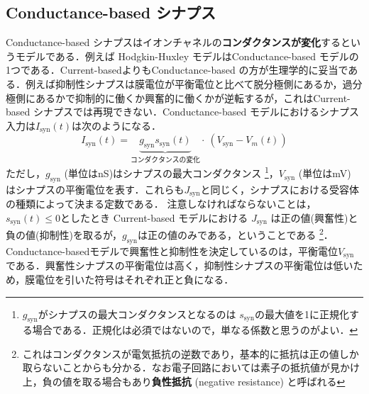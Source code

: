 \subsection{Conductance-based シナプス
}
Conductance-based シナプスはイオンチャネルの\textbf{コンダクタンスが変化}するというモデルである．例えば Hodgkin-Huxley モデルはConductance-based モデルの1つである．Current-basedよりもConductance-based の方が生理学的に妥当である．例えば抑制性シナプスは膜電位が平衡電位と比べて脱分極側にあるか，過分極側にあるかで抑制的に働くか興奮的に働くかが逆転するが，これはCurrent-based シナプスでは再現できない．Conductance-based モデルにおけるシナプス入力は$I_{\text{syn}}(t)$は次のようになる． 
\begin{equation}
I_{\text{syn}}(t)=\underbrace{g_{\text{syn}}s_{\text{syn}}(t)}_{コンダクタンスの変化}\cdot\ \left(V_{\text{syn}}-V_{m}(t)\right)    
\end{equation}
ただし，$g_{\text{syn}}$ (単位はnS)はシナプスの最大コンダクタンス \footnote{$g_{\text{syn}}$がシナプスの最大コンダクタンスとなるのは $s_{\text{syn}}$の最大値を1に正規化する場合である．正規化は必須ではないので，単なる係数と思うのがよい．}，$V_{\text{syn}}$ (単位はmV) はシナプスの平衡電位を表す．これらも$J_{\text{syn}}$と同じく，シナプスにおける受容体の種類によって決まる定数である．
注意しなければならないことは，$s_{\text{syn}}(t)\leq 0$としたとき Current-based モデルにおける $J_{\text{syn}}$ は正の値(興奮性)と負の値(抑制性)を取るが，$g_{\text{syn}}$は正の値のみである，ということである \footnote{これはコンダクタンスが電気抵抗の逆数であり，基本的に抵抗は正の値しか取らないことからも分かる．なお電子回路においては素子の抵抗値が見かけ上，負の値を取る場合もあり\textbf{負性抵抗} (negative resistance) と呼ばれる}．Conductance-basedモデルで興奮性と抑制性を決定しているのは，平衡電位$V_{\text{syn}}$である．興奮性シナプスの平衡電位は高く，抑制性シナプスの平衡電位は低いため，膜電位を引いた符号はそれぞれ正と負になる．
